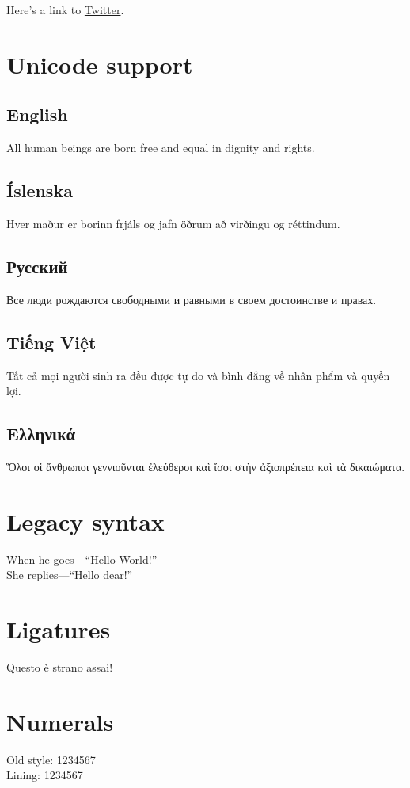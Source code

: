 \documentclass[11pt]{article} %
\begin{document}
Here's a link to \href{http://twitter.com/home}{Twitter}.

\section{Unicode support}

\subsection{English}
All human beings are born free and equal in dignity and rights.

\subsection{Íslenska}
Hver maður er borinn frjáls og jafn öðrum að virðingu og réttindum.

\subsection{Русский}
Все люди рождаются свободными и равными в своем достоинстве и
правах.

\subsection{Tiếng Việt}
Tất cả mọi người sinh ra đều được tự do và bình đẳng về nhân phẩm và
quyền lợi.

\subsection{Ελληνικά}
Ὅλοι οἱ ἄνθρωποι γεννιοῦνται ἐλεύθεροι καὶ ἴσοι στὴν ἀξιοπρέπεια
καὶ τὰ δικαιώματα.

\section{Legacy syntax}
When he goes---``Hello World!''\\
She replies—“Hello dear!”

\section{Ligatures}
Questo è strano assai!

\section{Numerals}
Old style: 1234567\\
Lining: 1234567
\end{document}

